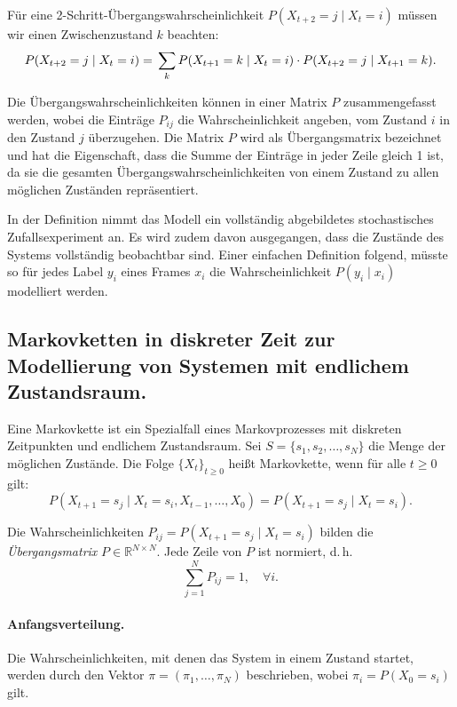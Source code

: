 Für eine 2-Schritt-Übergangswahrscheinlichkeit $P(X_{t+2} = j \mid X_t = i)$ müssen wir einen Zwischenzustand $k$ beachten:
\begin{equation}
P(X_{t+2} = j \mid X_t = i) = \newline \sum_k P(X_{t+1} = k \mid X_t = i) \cdot P(X_{t+2} = j \mid X_{t+1} = k).
\end{equation}

Die Übergangswahrscheinlichkeiten können in einer Matrix $P$ zusammengefasst werden, wobei die Einträge $P_{ij}$ die Wahrscheinlichkeit angeben, vom Zustand $i$ in den Zustand $j$ überzugehen. Die Matrix $P$ wird als Übergangsmatrix bezeichnet und hat die Eigenschaft, dass die Summe der Einträge in jeder Zeile gleich 1 ist, da sie die gesamten Übergangswahrscheinlichkeiten von einem Zustand zu allen möglichen Zuständen repräsentiert.

In der Definition nimmt das Modell ein vollständig abgebildetes stochastisches Zufallsexperiment an. Es wird zudem davon ausgegangen, dass die Zustände des Systems vollständig beobachtbar sind. Einer einfachen Definition folgend, müsste so für jedes Label $y_i$ eines Frames $x_i$ die Wahrscheinlichkeit $P(y_i \mid x_i)$ modelliert werden. \citet{drake88}

\subsection{Markovketten in diskreter Zeit zur Modellierung von Systemen mit endlichem Zustandsraum.}

Eine Markovkette ist ein Spezialfall eines Markovprozesses mit diskreten Zeitpunkten und endlichem Zustandsraum. 
Sei $S = \{s_1, s_2, \dots, s_N\}$ die Menge der möglichen Zustände.
Die Folge $\{X_t\}_{t \ge 0}$ heißt Markovkette, wenn für alle $t \ge 0$ gilt:
\begin{equation}
P(X_{t+1} = s_j \mid X_t = s_i, X_{t-1}, \dots, X_0)
= P(X_{t+1} = s_j \mid X_t = s_i).
\end{equation}

Die Wahrscheinlichkeiten $P_{ij} = P(X_{t+1} = s_j \mid X_t = s_i)$ bilden die
\emph{Übergangsmatrix} $P \in \mathbb{R}^{N \times N}$.
Jede Zeile von $P$ ist normiert, d.\,h.
\begin{equation}
\sum_{j=1}^{N} P_{ij} = 1, \quad \forall i.
\end{equation}

\paragraph{Anfangsverteilung.}
Die Wahrscheinlichkeiten, mit denen das System in einem Zustand startet, werden durch den Vektor $\pi = (\pi_1, \ldots, \pi_N)$ beschrieben, wobei $\pi_i = P(X_0 = s_i)$ gilt.

